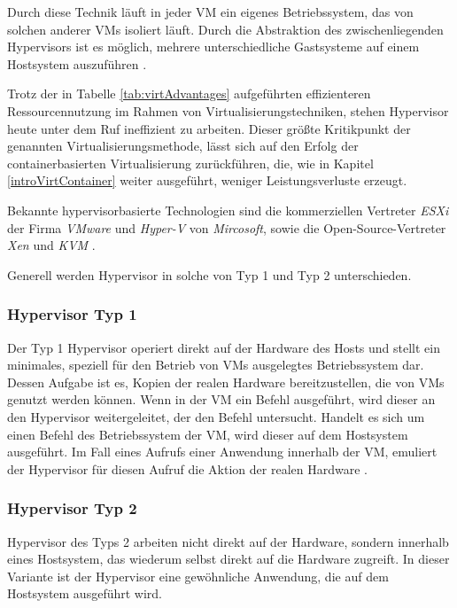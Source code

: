 \documentclass[../main.tex]{subfiles}
\begin{document}
      Durch diese Technik läuft in jeder \acrshort{VM} ein eigenes Betriebssystem, das von solchen anderer \acrshort{VM}s isoliert läuft. Durch die Abstraktion des zwischenliegenden Hypervisors ist es möglich, mehrere unterschiedliche Gastsysteme auf einem Hostsystem auszuführen \cite[S.2]{containerVirtPerformance}\cite[S.106]{tanenbaumOS}.

			Trotz der in Tabelle \ref{tab:virtAdvantages} aufgeführten effizienteren Ressourcennutzung im Rahmen von Virtualisierungstechniken, stehen Hypervisor heute unter dem Ruf ineffizient zu arbeiten. Dieser größte Kritikpunkt der genannten Virtualisierungsmethode, lässt sich auf den Erfolg der containerbasierten Virtualisierung zurückführen, die, wie in Kapitel \ref{introVirtContainer} weiter ausgeführt, weniger Leistungsverluste erzeugt.

			Bekannte hypervisorbasierte Technologien sind die kommerziellen Vertreter \emph{ESXi} der Firma \emph{VMware} und \emph{Hyper-V} von \emph{Mircosoft}, sowie die Open-Source-Vertreter \emph{Xen} und \emph{KVM} \cite[S.1]{dockerLXCKub}.

      Generell werden Hypervisor in solche von Typ 1 und Typ 2 unterschieden.




			\subsubsection{Hypervisor Typ 1}
				Der Typ 1 Hypervisor operiert direkt auf der Hardware des Hosts und stellt ein minimales, speziell für den Betrieb von VMs ausgelegtes Betriebssystem dar. Dessen Aufgabe ist es, Kopien der realen Hardware bereitzustellen, die von VMs genutzt werden können. Wenn in der VM ein Befehl ausgeführt, wird dieser an den Hypervisor weitergeleitet, der den Befehl untersucht. Handelt es sich um einen Befehl des Betriebssystem der VM, wird dieser auf dem Hostsystem ausgeführt. Im Fall eines Aufrufs einer Anwendung innerhalb der VM, emuliert der Hypervisor für diesen Aufruf die Aktion der realen Hardware \cite[S.663ff.]{tanenbaumOS}.

			\subsubsection{Hypervisor Typ 2}
				Hypervisor des Typs 2 arbeiten nicht direkt auf der Hardware, sondern innerhalb eines Hostsystem, das wiederum selbst direkt auf die Hardware zugreift. In dieser Variante ist der Hypervisor eine gewöhnliche Anwendung, die auf dem Hostsystem ausgeführt wird.
\end{document}
